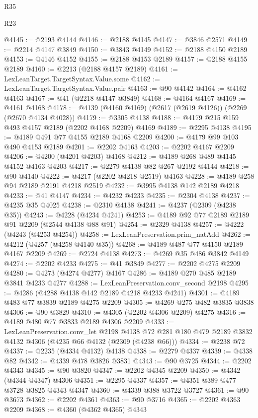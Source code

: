 \begin{lexlean}{R35}
\begin{lexlean}{R23}
\begin{coremodule}
{{{{{{{{{{{{{{{{{{{{{@4145 := @2193 @4144
@4146 := @2188 @4145
@4147 := @3846 @2571
@4149 := @2214 @4147 @3849
@4150 := @3843 @4149
@4152 := @2188 @4150 @2189
@4153 := @4146 @4152
@4155 := @2188 @4153 @2189
@4157 := @2188 @4155 @2189
@4160 := @2213 (@2188 @4157 @2189)
@4161 := LexLeanTarget.TargetSyntax.Value.some
@4162 := LexLeanTarget.TargetSyntax.Value.pair
@4163 := @90 @4142
@4164 := @4162 @4163
@4167 := @41 (@2218 @4147 @3849)
@4168 := @4164 @4167
@4169 := @4161 @4168
@4178 := @4139 (@4160 @4169) (@2617 (@2619 @4126)) (@2269 (@2670 @4134 @4028))
@4179 := @3305 @4138
@4188 := @4179 @215 @159 @493 @4157 @2189 (@2202 @4168 @2209) @4169
@4189 := @2295 @4138
@4195 := @4189 @491 @77 @4155 @2189 @4168 @2209
@4200 := @4179 @99 @103 @490 @4153 @2189
@4201 := @2202 @4163
@4203 := @2202 @4167 @2209
@4206 := @4200 (@4201 @4203) @4168
@4212 := @4189 @268 @489 @4145 @4152 @4163 @4203
@4217 := @2279 @4138 @82 @267 @2192 @4144
@4218 := @90 @4140
@4222 := @4217 (@2202 @4218 @2519) @4163
@4228 := @4189 @258 @94 @2189 @2191 @4218 @2519
@4232 := @3995 @4138 @142 @2189 @4218
@4233 := @41 @4147
@4234 := @4232 @4233
@4235 := @2304 @4138
@4237 := @4235 @35 @4025
@4238 := @2310 @4138
@4241 := @4237 (@2309 (@4238 @35))
@4243 := @4228 (@4234 @4241)
@4253 := @4189 @92 @77 @2189 @2189 @91 @2209 (@2544 @4138 @88 @91)
@4254 := @2329 @4138
@4257 := @4222 (@4243 (@4253 @4254))
@4258 := LexLeanPreservation.prim_natAdd
@4262 := @4212 (@4257 (@4258 @4140 @35))
@4268 := @4189 @487 @77 @4150 @2189 @4167 @2209
@4269 := @2724 @4138
@4273 := @4269 @35 @486 @3842 @4149
@4274 := @2202 @4233
@4275 := @41 @3849
@4277 := @2202 @4275 @2209
@4280 := @4273 (@4274 @4277) @4167
@4286 := @4189 @270 @485 @2189 @3841 @4233 @4277
@4288 := LexLeanPreservation.conv_second @2198
@4295 := @4286 (@4288 @4138 @142 @2189 @4218 @4233 @4241)
@4301 := @4189 @483 @77 @3839 @2189 @4275 @2209
@4305 := @4269 @275 @482 @3835 @3838
@4306 := @90 @3829
@4310 := @4305 (@2202 @4306 @2209) @4275
@4316 := @4189 @480 @77 @3833 @2189 @4306 @2209
@4333 := LexLeanPreservation.conv_let
    @2198
    @4138
    @72
    @281
    @180
    @479
    @2189
    @3832
    @4132
    @4306
    (@4235 @66 @4132 (@2309 (@4238 @66)))
@4334 := @2238 @72
@4337 := @2235 (@4334 @4132) @4138
@4338 := @2279 @4337
@4339 := @4338 @82
@4342 := @4339 @478 @3826 @3831
@4343 := @90 @3725
@4344 := @2202 @4343
@4345 := @90 @3820
@4347 := @2202 @4345 @2209
@4350 := @4342 (@4344 @4347) @4306
@4351 := @2295 @4337
@4357 := @4351 @389 @477 @3728 @3825 @4343 @4347
@4360 := @4339 @388 @3722 @3727
@4361 := @90 @3673
@4362 := @2202 @4361
@4363 := @90 @3716
@4365 := @2202 @4363 @2209
@4368 := @4360 (@4362 @4365) @4343
}}}}}}}}}}}}}}}}}}}}}
\end{coremodule}
\end{lexlean}
\end{lexlean}
